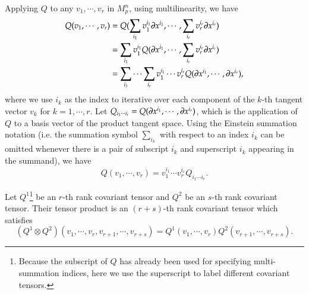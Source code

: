 \documentclass[11pt, a4paper]{book}
\begin{document}
Applying $Q$ to any $v_1, \cdots, v_r$ in $M_p^n$, using multilinearity, we have
\begin{equation}
  \label{eq:covariant-tensor-applied-to-r-vectors-expanded}
  \begin{aligned}
    Q(v_1,\cdots,v_r) &= Q(\sum_{i_1}v_1^{i_1} \boldsymbol{\partial}x^{i_1}, \cdots,
    \sum_{i_r}v_r^{i_r} \boldsymbol{\partial}x^{i_r}) \\
    &= \sum_{i_1}v_1^{i_1} Q(\boldsymbol{\partial}x^{i_1},\cdots,\sum_{i_r}v_r^{i_r}\boldsymbol{\partial}x^{i_r}) \\
    &= \sum_{i_1}\cdots\sum_{i_r}v_1^{i_1}\cdots v_r^{i_r}
    Q(\boldsymbol{\partial}x^{i_1},\cdots,\boldsymbol{\partial}x^{i_r}),
  \end{aligned}
\end{equation}
where we use $i_k$ as the index to iterative over each component of the $k$-th tangent
vector $v_k$ for $k=1,\cdots,r$. Let
$Q_{i_1\cdots i_r}= Q(\boldsymbol{\partial}x^{i_1},\cdots,\boldsymbol{\partial}x^{i_r})$, which is the
application of $Q$ to a basis vector of the product tangent space. Using the Einstein
summation notation (i.e. the summation symbol $\sum_{i_k}$ with respect to an index $i_k$
can be omitted whenever there is a pair of subscript $i_k$ and superscript $i_k$ appearing
in the summand), we have
\begin{equation}
  \label{eq:covariant-tensor-applied-to-r-vectors}
  Q(v_1,\cdots,v_r) = v_1^{i_1}\cdots v_r^{i_r} Q_{i_1 \cdots i_r}.
\end{equation}

\begin{Definition}
  Let $Q^1$\footnote{Because the subscript of $Q$ has already been used for specifying
    multi-summation indices, here we use the superscript to label different covariant
    tensors.} be an $r$-th rank covariant tensor and $Q^2$ be an $s$-th rank covariant
  tensor. Their tensor product is an $(r+s)$-th rank covariant tensor which satisfies
  \begin{equation}
    \label{eq:tensor-product-of-covariant-tensors}
    \left( Q^1 \otimes Q^2 \right) (v_{1},\cdots,v_{r}, v_{r+1},\cdots,v_{r+s}) =
    Q^1(v_{1},\cdots,v_{r}) Q^2(v_{r+1},\cdots,v_{r+s}).
  \end{equation}
\end{Definition}
\end{document}
